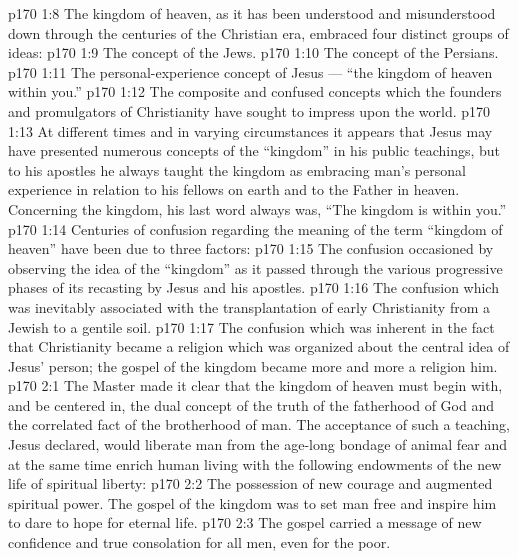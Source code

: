 \vs p170 1:8 The kingdom of heaven, as it has been understood and misunderstood down through the centuries of the Christian era, embraced four distinct groups of ideas:
\vs p170 1:9 \bibnobreakspace The concept of the Jews.
\vs p170 1:10 \bibnobreakspace The concept of the Persians.
\vs p170 1:11 \bibnobreakspace The personal\hyp{}experience concept of Jesus --- \textcolor{ubdarkred}{“the kingdom of heaven within you.”}
\vs p170 1:12 \bibnobreakspace The composite and confused concepts which the founders and promulgators of Christianity have sought to impress upon the world.
\vs p170 1:13 \pc At different times and in varying circumstances it appears that Jesus may have presented numerous concepts of the “kingdom” in his public teachings, but to his apostles he always taught the kingdom as embracing man’s personal experience in relation to his fellows on earth and to the Father in heaven. Concerning the kingdom, his last word always was, \textcolor{ubdarkred}{“The kingdom is within you.”}
\vs p170 1:14 Centuries of confusion regarding the meaning of the term “kingdom of heaven” have been due to three factors:
\vs p170 1:15 \bibnobreakspace The confusion occasioned by observing the idea of the “kingdom” as it passed through the various progressive phases of its recasting by Jesus and his apostles.
\vs p170 1:16 \bibnobreakspace The confusion which was inevitably associated with the transplantation of early Christianity from a Jewish to a gentile soil.
\vs p170 1:17 \bibnobreakspace The confusion which was inherent in the fact that Christianity became a religion which was organized about the central idea of Jesus’ person; the gospel of the kingdom became more and more a religion  him.
\vs p170 2:1 The Master made it clear that the kingdom of heaven must begin with, and be centered in, the dual concept of the truth of the fatherhood of God and the correlated fact of the brotherhood of man. The acceptance of such a teaching, Jesus declared, would liberate man from the age\hyp{}long bondage of animal fear and at the same time enrich human living with the following endowments of the new life of spiritual liberty:
\vs p170 2:2 \bibnobreakspace The possession of new courage and augmented spiritual power. The gospel of the kingdom was to set man free and inspire him to dare to hope for eternal life.
\vs p170 2:3 \pc {}\bibnobreakspace The gospel carried a message of new confidence and true consolation for all men, even for the poor.
